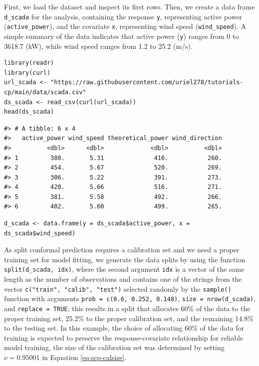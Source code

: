 First, we load the dataset and inspect its first rows. Then, we create a
data frame \texttt{d\_scada} for the analysis, containing the response \texttt{y},
representing active power (\texttt{active\_power}), and the covariate \texttt{x},
representing wind speed (\texttt{wind\_speed}). A simple summary of the data
indicates that active power (\texttt{y}) ranges from 0 to 3618.7 (kW), while
wind speed ranges from 1.2 to 25.2 (m/s).

\begin{verbatim}
library(readr)
library(curl)
url_scada <- "https://raw.githubusercontent.com/uriel278/tutorials-cp/main/data/scada.csv"
ds_scada <- read_csv(curl(url_scada))
head(ds_scada)
\end{verbatim}

\begin{verbatim}
#> # A tibble: 6 x 4
#>   active_power wind_speed theoretical_power wind_direction
#>          <dbl>      <dbl>             <dbl>          <dbl>
#> 1         380.       5.31              416.           260.
#> 2         454.       5.67              520.           269.
#> 3         306.       5.22              391.           273.
#> 4         420.       5.66              516.           271.
#> 5         381.       5.58              492.           266.
#> 6         402.       5.60              499.           265.
\end{verbatim}

\begin{verbatim}
d_scada <- data.frame(y = ds_scada$active_power, x = ds_scada$wind_speed)
\end{verbatim}

As split conformal prediction requires a calibration set and we need a
proper training set for model fitting, we generate the data splits by
using the function \texttt{split(d\_scada,\ idx)}, where the second argument
\texttt{idx} is a vector of the same length as the number of observations and
contains one of the strings from the vector
\texttt{c("train",\ "calib",\ "test")} selected randomly by the \texttt{sample()}
function with arguments \texttt{prob\ =\ c(0.6,\ 0.252,\ 0.148)},
\texttt{size\ =\ nrow(d\_scada)}, and \texttt{replace\ =\ TRUE}; this results in a split
that allocates 60\% of the data to the proper training set, 25.2\% to the
proper calibration set, and the remaining 14.8\% to the testing set. In this example, the choice
of allocating 60\% of the data for training is expected to preserve the
response-covariate relationship for reliable model training, the size of
the calibration set was determined by setting \(\nu = 0.95001\) in
Equation \eqref{eq:scp-calsize}.


